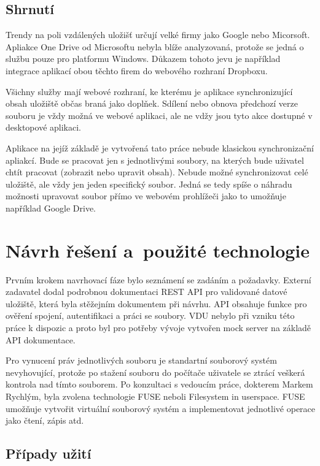 \section{Shrnutí}

Trendy na poli vzdálených uložišť určují velké firmy jako Google nebo Micorsoft. Apliakce One Drive od Microsoftu nebyla blíže analyzovaná, protože se jedná
o službu pouze pro platformu Windows. Důkazem tohoto jevu je například integrace aplikací obou těchto firem do webového rozhraní Dropboxu.

Všichny služby mají webové rozhraní, ke kterému je aplikace synchronizující obsah uložiště občas braná jako doplňek. Sdílení nebo obnova předchozí verze souboru
je vždy možná ve webové aplikaci, ale ne vdžy jsou tyto akce dostupné v desktopové aplikaci.

Aplikace na jejíž základě je vytvořená tato práce nebude klasickou synchronizační apliakcí. Bude se pracovat jen s jednotlivými soubory, na kterých bude uživatel chtít
pracovat (zobrazit nebo upravit obsah). Nebude možné synchronizovat celé uložiště, ale vždy jen jeden specifický soubor. Jedná se tedy spíše o náhradu možnosti upravovat
soubor přímo ve webovém prohlížeči jako to umožňuje například Google Drive.

\chapter{Návrh řešení a použité technologie}

Prvním krokem navrhovací fáze bylo seznámení se zadáním a požadavky. Externí zadavatel dodal podrobnou dokumentaci REST API pro validované datové uložiště, která
byla stěžejním dokumentem při návrhu. API obsahuje funkce pro ověření spojení, autentifikaci a práci se soubory. VDU nebylo při vzniku této práce k dispozic a proto
byl pro potřeby vývoje vytvořen mock server na základě API dokumentace.

Pro vynucení práv jednotlivých souboru je standartní souborový systém nevyhovující, protože po stažení souboru do počítače uživatele se ztrácí veškerá kontrola nad
tímto souborem. Po konzultaci s vedoucím práce, dokterem Markem Rychlým, byla zvolena technologie FUSE neboli Filesystem in userspace. FUSE umožňuje vytvořit virtuální
souborový systém a implementovat jednotlivé operace jako čtení, zápis atd.

\section{Případy užití}

